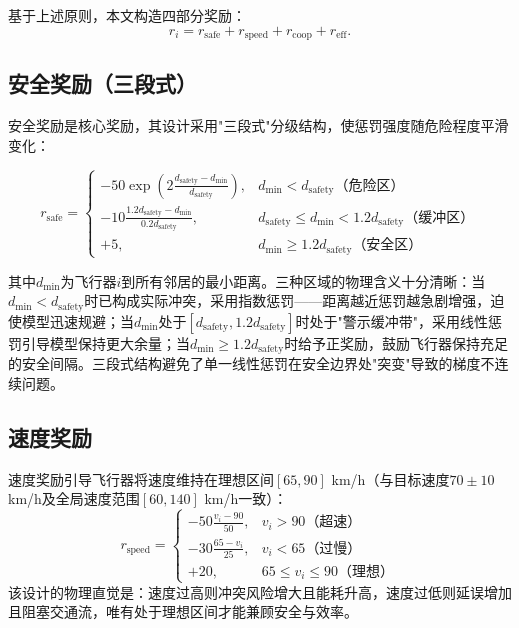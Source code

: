 \documentclass[12pt,a4paper,UTF8]{ctexbook}
\begin{document}
基于上述原则，本文构造四部分奖励：
\begin{equation}
    r_i = r_{\text{safe}} + r_{\text{speed}} + r_{\text{coop}} + r_{\text{eff}}.
    \label{eq:reward_total}
\end{equation}

\subsection{安全奖励（三段式）}

安全奖励是核心奖励，其设计采用"三段式"分级结构，使惩罚强度随危险程度平滑变化：

\begin{equation}
    r_{\text{safe}} = \begin{cases}
        -50 \exp\!\left(2\frac{d_{\text{safety}}-d_{\min}}{d_{\text{safety}}}\right), & d_{\min}<d_{\text{safety}} \text{（危险区）}\\
        -10 \frac{1.2d_{\text{safety}}-d_{\min}}{0.2d_{\text{safety}}}, & d_{\text{safety}}\leq d_{\min}<1.2d_{\text{safety}} \text{（缓冲区）}\\
        +5, & d_{\min}\geq1.2d_{\text{safety}} \text{（安全区）}
    \end{cases}
    \label{eq:reward_safe}
\end{equation}

其中$d_{\min}$为飞行器$i$到所有邻居的最小距离。三种区域的物理含义十分清晰：当$d_{\min}<d_{\text{safety}}$时已构成实际冲突，采用指数惩罚——距离越近惩罚越急剧增强，迫使模型迅速规避；当$d_{\min}$处于$[d_{\text{safety}},1.2d_{\text{safety}}]$时处于"警示缓冲带"，采用线性惩罚引导模型保持更大余量；当$d_{\min}\geq1.2d_{\text{safety}}$时给予正奖励，鼓励飞行器保持充足的安全间隔。三段式结构避免了单一线性惩罚在安全边界处"突变"导致的梯度不连续问题。

\subsection{速度奖励}

速度奖励引导飞行器将速度维持在理想区间$[65, 90]$ km/h（与目标速度$70\pm10$ km/h及全局速度范围$[60,140]$ km/h一致）：
\begin{equation}
    r_{\text{speed}} = \begin{cases}
        -50\frac{v_i-90}{50}, & v_i>90 \text{（超速）}\\
        -30\frac{65-v_i}{25}, & v_i<65 \text{（过慢）}\\
        +20, & 65\leq v_i\leq 90 \text{（理想）}
    \end{cases}
    \label{eq:reward_speed}
\end{equation}
该设计的物理直觉是：速度过高则冲突风险增大且能耗升高，速度过低则延误增加且阻塞交通流，唯有处于理想区间才能兼顾安全与效率。
\end{document}
